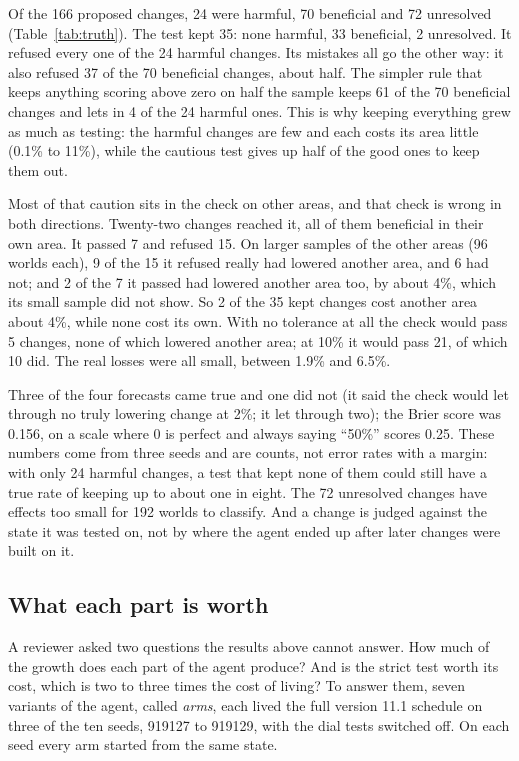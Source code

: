\documentclass[11pt]{article}
\begin{document}
Of the 166 proposed changes, 24 were harmful, 70 beneficial and 72 unresolved (Table~\ref{tab:truth}). The test kept 35: none harmful, 33 beneficial, 2 unresolved. It refused every one of the 24 harmful changes. Its mistakes all go the other way: it also refused 37 of the 70 beneficial changes, about half. The simpler rule that keeps anything scoring above zero on half the sample keeps 61 of the 70 beneficial changes and lets in 4 of the 24 harmful ones. This is why keeping everything grew as much as testing: the harmful changes are few and each costs its area little (0.1\% to 11\%), while the cautious test gives up half of the good ones to keep them out.

Most of that caution sits in the check on other areas, and that check is wrong in both directions. Twenty-two changes reached it, all of them beneficial in their own area. It passed 7 and refused 15. On larger samples of the other areas (96 worlds each), 9 of the 15 it refused really had lowered another area, and 6 had not; and 2 of the 7 it passed had lowered another area too, by about 4\%, which its small sample did not show. So 2 of the 35 kept changes cost another area about 4\%, while none cost its own. With no tolerance at all the check would pass 5 changes, none of which lowered another area; at 10\% it would pass 21, of which 10 did. The real losses were all small, between 1.9\% and 6.5\%.

Three of the four forecasts came true and one did not (it said the check would let through no truly lowering change at 2\%; it let through two); the Brier score was 0.156, on a scale where 0 is perfect and always saying ``50\%'' scores 0.25. These numbers come from three seeds and are counts, not error rates with a margin: with only 24 harmful changes, a test that kept none of them could still have a true rate of keeping up to about one in eight. The 72 unresolved changes have effects too small for 192 worlds to classify. And a change is judged against the state it was tested on, not by where the agent ended up after later changes were built on it.



\subsection{What each part is worth}
\label{sec:arms}

A reviewer asked two questions the results above cannot answer. How much of the growth does each part of the agent produce? And is the strict test worth its cost, which is two to three times the cost of living? To answer them, seven variants of the agent, called \emph{arms}, each lived the full version 11.1 schedule on three of the ten seeds, 919127 to 919129, with the dial tests switched off. On each seed every arm started from the same state.
\end{document}
